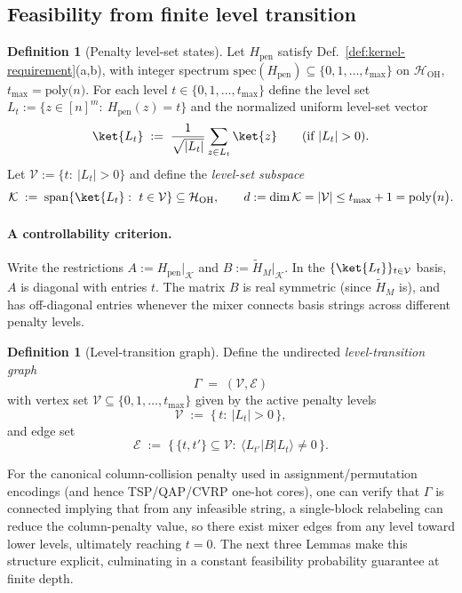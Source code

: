 \documentclass[a4paper,unpublished,onecolumn,11pt]{quantumarticle}
\theoremstyle{definition}
\newtheorem{definition}[theorem]{Definition}
\theoremstyle{remark}
\newcommand{\poly}[1]{\mathrm{poly}\bigl(#1\bigr)}
\newcommand{\OH}{\mathcal{H}_{\mathrm{OH}}}
\begin{document}
\subsection{Feasibility from finite level transition}
\label{sec:feasibility-from-finite-level-transition}
\medskip

\begin{definition}[Penalty level-set states]
\label{def:levelset-states}
Let $H_{\mathrm{pen}}$ satisfy Def.~\ref{def:kernel-requirement}(a,b), with integer spectrum
$\mathrm{spec}(H_{\mathrm{pen}})\subseteq\{0,1,\dots,t_{\max}\}$ on $\OH$, $t_{\max}=\poly n$.
For each level $t\in\{0,1,\dots,t_{\max}\}$ define the level set
\(
  L_t:=\{z\in[n]^m:\ H_{\mathrm{pen}}(z)=t\}
\)
and the normalized uniform level-set vector
\[
  \ket{L_t}
  \;:=\;
  \frac{1}{\sqrt{|L_t|}}\sum_{z\in L_t}\ket{z}
  \qquad (\text{if }|L_t|>0).
\]
Let $\mathcal V:=\{t:\ |L_t|>0\}$ and define the \emph{level-set subspace}
\[
  \mathcal K \;:=\; \mathrm{span}\{\ket{L_t}:\ t\in\mathcal V\}\subseteq \OH,
  \qquad d:=\dim\mathcal K = |\mathcal V|\le t_{\max}+1 = \poly n.
\]
\end{definition}

\paragraph{A controllability criterion.}
Write the restrictions $A:=H_{\mathrm{pen}}|_{\mathcal K}$ and $B:=\widetilde H_M|_{\mathcal K}$.
In the $\{\ket{L_t}\}_{t\in\mathcal V}$ basis, $A$ is diagonal with entries $t$.
The matrix $B$ is real symmetric (since $\widetilde H_M$ is), and has off-diagonal entries whenever
the mixer connects basis strings across different penalty levels.

\begin{definition}[Level-transition graph]
\label{def:level-graph}
Define the undirected \emph{level-transition graph}
\[
\Gamma \;=\; (\mathcal V,\mathcal E)
\]
with vertex set \(\mathcal V\subseteq \{0,1,\dots,t_{\max}\}\) given by the active
penalty levels
\[
\mathcal V \;:=\; \{\,t:\ |L_t|>0\,\},
\]
and edge set
\[
\mathcal E \;:=\; \bigl\{\,\{t,t'\}\subseteq \mathcal V:\ \langle L_{t'}|B|L_t\rangle \neq 0\,\bigr\}.
\]
\end{definition}








\medskip



For the canonical column-collision penalty used in assignment/permutation encodings (and hence TSP/QAP/CVRP one-hot cores), one can verify that $\mathsf \Gamma$ is connected implying that from any infeasible string, a single-block relabeling can reduce the column-penalty value, so there exist mixer edges from any level toward lower levels, ultimately reaching $t=0$. The next three Lemmas make this structure explicit, culminating in a constant feasibility probability guarantee at finite depth.
\end{document}
